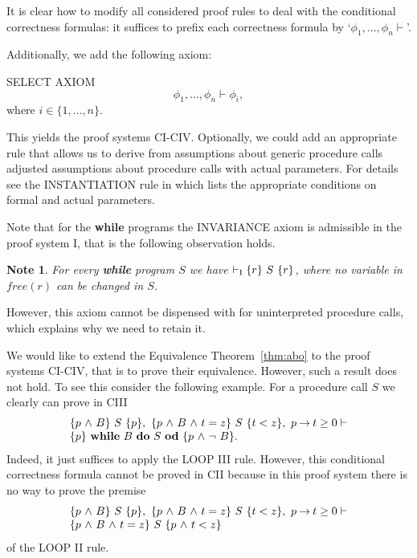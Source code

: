 \documentclass[manuscript, screen, review]{acmart}
\newtheorem{note}{Note}  %
\begin{document}
It is clear how to modify all considered proof rules to deal with the
conditional correctness formulas: it suffices to prefix each
correctness formula by `$\phi_1, \dots, \phi_n \vdash$'.  

Additionally, we add the following axiom:
\III

\NI
SELECT AXIOM
\[
\phi_1, \dots, \phi_n \vdash \phi_i,
\]
where $i \in \{1, \dots, n\}$.
\III

This yields the proof systems CI-CIV.
Optionally, we could add an appropriate rule that allows us to
derive from assumptions about generic procedure calls adjusted
assumptions about procedure calls with actual parameters.  For details
see the INSTANTIATION rule in \cite[page 159]{ABO09} which lists the
appropriate conditions on formal and actual parameters.

Note that for the \textbf{while} programs the INVARIANCE axiom is admissible in the proof system I, that is the following
observation holds.

\begin{note} \label{note:1}
  For every \textbf{while} program $S$ we have
  $\vdash_{\mathrm{I}} \mbox{$\{{r}\}\ {S}\ \{{r}\}$}$, where no variable in
  $\mathit{free}(r)$ can be changed in $S$.

\end{note}

However, this axiom cannot be dispensed with for uninterpreted procedure calls, which explains why we
need to retain it.

We would like to extend the Equivalence Theorem~\ref{thm:abo} to the
proof systems CI-CIV, that is to prove their equivalence.  However,
such a result does not hold.  To see this consider the following
example.  For a procedure call $S$ we clearly can prove in CIII
\[
  \begin{array}{l}
    \mbox{$\{{p \mbox{$\ \wedge\ $} B}\}\ {S}\ \{{p}\}$}, \ \mbox{$\{{p \mbox{$\ \wedge\ $} B \mbox{$\ \wedge\ $} t=z}\}\ {S}\ \{{t<z}\}$}, \ p \mbox{$\:\rightarrow\:$} t \geq 0 \vdash \\
    \mbox{$\{{p}\}\ {\mbox{$\mbox{{\bf while}\ } {B}\ \mbox{{\bf do}\ } {S}\ \mbox{{\bf od}}$}}\ \{{p \mbox{$\ \wedge\ $} \neg\ B}\}$}.
  \end{array}
\]
Indeed, it just suffices to apply the LOOP III rule.
However, this conditional correctness formula cannot be proved in CII
because in this proof system there is no way to prove the premise
\[
  \begin{array}{l}  
    \mbox{$\{{p \mbox{$\ \wedge\ $} B}\}\ {S}\ \{{p}\}$}, \ \mbox{$\{{p \mbox{$\ \wedge\ $} B \mbox{$\ \wedge\ $} t=z}\}\ {S}\ \{{t<z}\}$}, \ p \mbox{$\:\rightarrow\:$} t \geq 0 \vdash  \\
    \mbox{$\{{p \mbox{$\ \wedge\ $} B \mbox{$\ \wedge\ $} t=z}\}\ {S}\ \{{p \mbox{$\ \wedge\ $} t<z}\}$}
  \end{array}    
\]
of the LOOP II rule.
\end{document}
